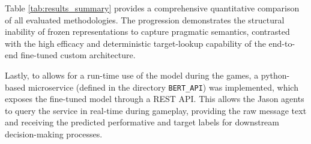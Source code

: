 Table \ref{tab:results_summary} provides a comprehensive quantitative comparison of all evaluated methodologies. The progression demonstrates the structural inability of frozen representations to capture pragmatic semantics, contrasted with the high efficacy and deterministic target-lookup capability of the end-to-end fine-tuned custom architecture.

\begin{table}[H]
    \centering
    \caption{Summary of classification accuracies across methodologies and datasets.}
    \label{tab:results_summary}
\end{table}

Lastly, to allows for a run-time use of the model during the games, a python-based microservice (defined in the directory \texttt{BERT\_API}) was implemented, which exposes the fine-tuned model through a REST API. This allows the Jason agents to query the service in real-time during gameplay, providing the raw message text and receiving the predicted performative and target labels for downstream decision-making processes.
